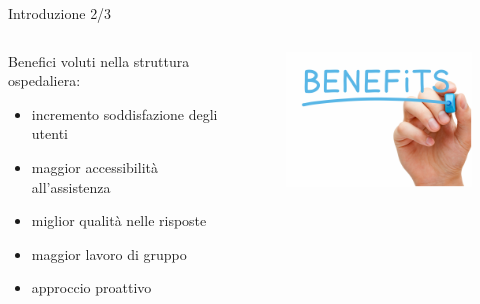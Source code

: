 \begin{frame}{Introduzione \small{2/3}}
\begin{columns}
\begin{column}{0.75\textwidth}
Benefici voluti nella struttura ospedaliera:
\begin{itemize}
\item{incremento soddisfazione degli utenti}
\item{maggior accessibilità all'assistenza}
\item{miglior qualità nelle risposte}
\item{maggior lavoro di gruppo}
\item{approccio proattivo}
\end{itemize}
\end{column}
\begin{column}{0.25\textwidth}
\begin{figure}
\includegraphics[scale=0.5]{Images/Benefit.png}
\end{figure}
\end{column}
\end{columns}
\end{frame}

